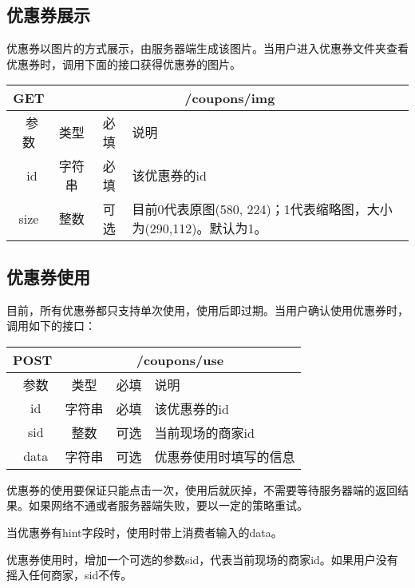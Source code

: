  

\subsection{优惠券展示}
优惠券以图片的方式展示，由服务器端生成该图片。当用户进入优惠券文件夹查看优惠券时，调用下面的接口获得优惠券的图片。

\begin{table}[H]
   \begin{center}
\begin{tabular}{|c|c|c|p{12cm}|}
\hline
GET & \multicolumn{3}{|c|}{/coupons/img} \\
\hline\hline
 \  参数  & 类型 & 必填 &  说明  \\
\hline
 \  id  & 字符串 & 必填 &  该优惠券的id  \\
\hline
 size  & 整数 & 可选 &  目前0代表原图(580, 224)；1代表缩略图，大小为(290,112)。默认为1。\\ 
\hline
\end{tabular}
   \end{center}
\end{table}


\subsection{优惠券使用}
目前，所有优惠券都只支持单次使用，使用后即过期。当用户确认使用优惠券时，调用如下的接口：
\begin{table}[H]
   \begin{center}
\begin{tabular}{|c|c|c|p{12cm}|}
\hline
POST & \multicolumn{3}{|c|}{/coupons/use} \\
\hline\hline
 \  参数  & 类型 & 必填 &  说明  \\
\hline
 \  id  & 字符串 & 必填 &  该优惠券的id  \\
 \hline
 \ sid  &  整数 & 可选 & 当前现场的商家id\\  
 \hline
 \  data  & 字符串 & 可选 &  优惠券使用时填写的信息  \\
\hline
\end{tabular}
   \end{center}
\end{table}

优惠券的使用要保证只能点击一次，使用后就灰掉，不需要等待服务器端的返回结果。如果网络不通或者服务器端失败，要以一定的策略重试。

当优惠券有hint字段时，使用时带上消费者输入的data。

优惠券使用时，增加一个可选的参数sid，代表当前现场的商家id。如果用户没有摇入任何商家，sid不传。

